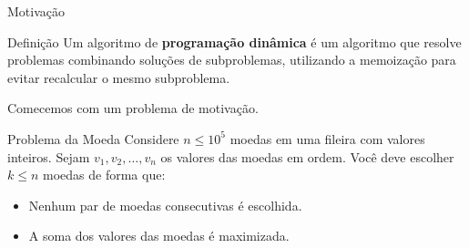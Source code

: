 \begin{frame}{Motivação}

    \begin{block}{Definição}
        Um algoritmo de {\bf programação dinâmica} é um algoritmo que resolve problemas combinando soluções de subproblemas, utilizando a memoização para evitar recalcular o mesmo subproblema.
    \end{block}

    Comecemos com um problema de motivação.

    \begin{block}{Problema da Moeda}
        Considere $n \leq 10^5$ moedas em uma fileira com valores inteiros. Sejam $v_1, v_2, \dots, v_n$ os valores das moedas em ordem. Você deve escolher $k \leq n$ moedas de forma que:
        \begin{itemize}
            \item Nenhum par de moedas consecutivas é escolhida.
            \item A soma dos valores das moedas é maximizada.
        \end{itemize}
    \end{block}
    

\end{frame}
